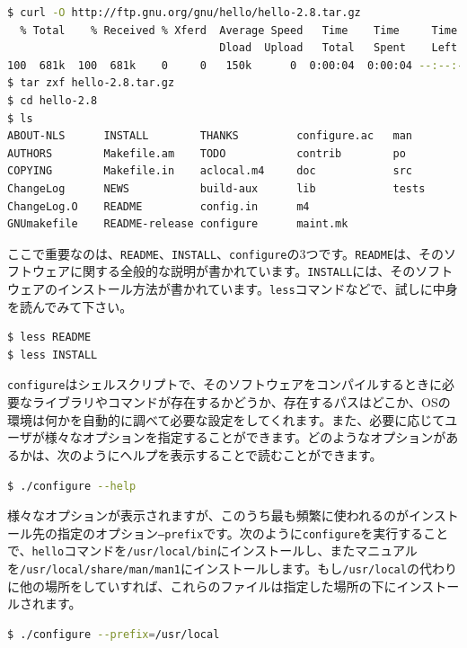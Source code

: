 \begin{lstlisting}[language=bash]
$ curl -O http://ftp.gnu.org/gnu/hello/hello-2.8.tar.gz
  % Total    % Received % Xferd  Average Speed   Time    Time     Time  Current
                                 Dload  Upload   Total   Spent    Left  Speed
100  681k  100  681k    0     0   150k      0  0:00:04  0:00:04 --:--:--  166k
$ tar zxf hello-2.8.tar.gz
$ cd hello-2.8 
$ ls
ABOUT-NLS      INSTALL        THANKS         configure.ac   man
AUTHORS        Makefile.am    TODO           contrib        po
COPYING        Makefile.in    aclocal.m4     doc            src
ChangeLog      NEWS           build-aux      lib            tests
ChangeLog.O    README         config.in      m4
GNUmakefile    README-release configure      maint.mk
\end{lstlisting}

ここで重要なのは、\texttt{README}、\texttt{INSTALL}、\texttt{configure}の3つです。\texttt{README}は、そのソフトウェアに関する全般的な説明が書かれています。\texttt{INSTALL}には、そのソフトウェアのインストール方法が書かれています。\texttt{less}コマンドなどで、試しに中身を読んでみて下さい。

\begin{lstlisting}[language=bash]
$ less README
$ less INSTALL
\end{lstlisting}

\texttt{configure}はシェルスクリプトで、そのソフトウェアをコンパイルするときに必要なライブラリやコマンドが存在するかどうか、存在するパスはどこか、OSの環境は何かを自動的に調べて必要な設定をしてくれます。また、必要に応じてユーザが様々なオプションを指定することができます。どのようなオプションがあるかは、次のようにヘルプを表示することで読むことができます。

\begin{lstlisting}[language=bash]
$ ./configure --help
\end{lstlisting}

様々なオプションが表示されますが、このうち最も頻繁に使われるのがインストール先の指定のオプション\texttt{--prefix}です。次のように\texttt{configure}を実行することで、\texttt{hello}コマンドを\texttt{/usr/local/bin}にインストールし、またマニュアルを\texttt{/usr/local/share/man/man1}にインストールします。もし\texttt{/usr/local}の代わりに他の場所をしていすれば、これらのファイルは指定した場所の下にインストールされます。
\begin{lstlisting}[language=bash]
$ ./configure --prefix=/usr/local
\end{lstlisting} 

